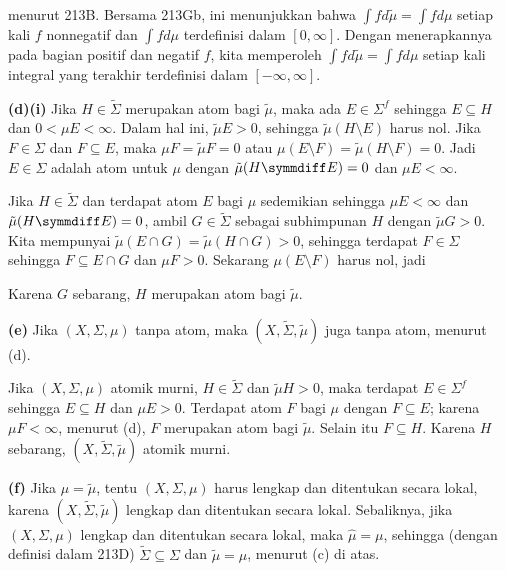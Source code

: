 {\noindent menurut 213B.   Bersama 213Gb, ini menunjukkan bahwa
$\int fd\tilde\mu=\int fd\mu$ setiap kali $f$ nonnegatif dan
$\int fd\mu$ terdefinisi dalam $[0,\infty]$.   Dengan menerapkannya pada
bagian positif dan negatif $f$, kita memperoleh
$\int fd\tilde\mu=\int fd\mu$ setiap kali integral yang terakhir terdefinisi
dalam $[-\infty,\infty]$.

\medskip

{\bf (d)(i)} Jika $H\in\tilde\Sigma$ merupakan atom bagi $\tilde\mu$, maka
ada $E\in\Sigma^f$ sehingga $E\subseteq H$ dan $0<\mu E<\infty$.
Dalam hal ini, $\tilde\mu E>0$, sehingga $\tilde\mu(H\setminus E)$ harus nol.
Jika $F\in\Sigma$ dan $F\subseteq E$, maka
$\mu F=\tilde\mu F=0$ atau $\mu(E\setminus F)=\tilde\mu(H\setminus F)=0$.
Jadi $E\in\Sigma$ adalah atom untuk $\mu$ dengan
$\tilde\mu(H\symmdiff E)=0$ dan $\mu E<\infty$.

\medskip

 Jika $H\in\tilde\Sigma$ dan terdapat atom $E$ bagi $\mu$
sedemikian sehingga $\mu E<\infty$ dan $\tilde\mu(H\symmdiff E)=0$, ambil
$G\in\tilde\Sigma$ sebagai subhimpunan $H$ dengan $\tilde\mu G>0$.
Kita mempunyai $\tilde\mu(E\cap G)=\tilde\mu(H\cap G)>0$, sehingga terdapat
$F\in\Sigma$ sehingga $F\subseteq E\cap G$ dan $\mu F>0$.   Sekarang
$\mu(E\setminus F)$ harus nol, jadi


\noindent Karena $G$ sebarang, $H$ merupakan atom bagi $\tilde\mu$.

\medskip

{\bf (e)} Jika $(X,\Sigma,\mu)$ tanpa atom, maka
$(X,\tilde\Sigma,\tilde\mu)$ juga tanpa atom, menurut (d).

Jika $(X,\Sigma,\mu)$ atomik murni, $H\in\tilde\Sigma$ dan
$\tilde\mu H>0$, maka terdapat $E\in\Sigma^f$ sehingga
$E\subseteq H$ dan $\mu E>0$.
Terdapat atom $F$ bagi $\mu$ dengan $F\subseteq E$;  karena $\mu F<\infty$,
menurut (d), $F$ merupakan atom bagi $\tilde\mu$.   Selain itu $F\subseteq H$.
Karena $H$ sebarang, $(X,\tilde\Sigma,\tilde\mu)$ atomik murni.

\medskip

{\bf (f)} Jika $\mu=\tilde\mu$, tentu $(X,\Sigma,\mu)$ harus
lengkap dan ditentukan secara lokal, karena $(X,\tilde\Sigma,\tilde\mu)$
lengkap dan ditentukan secara lokal.   Sebaliknya, jika $(X,\Sigma,\mu)$
lengkap dan ditentukan secara lokal, maka $\hat\mu=\mu$, sehingga (dengan
definisi dalam 213D) $\tilde\Sigma\subseteq\Sigma$ dan $\tilde\mu=\mu$,
menurut (c) di atas.
}%

